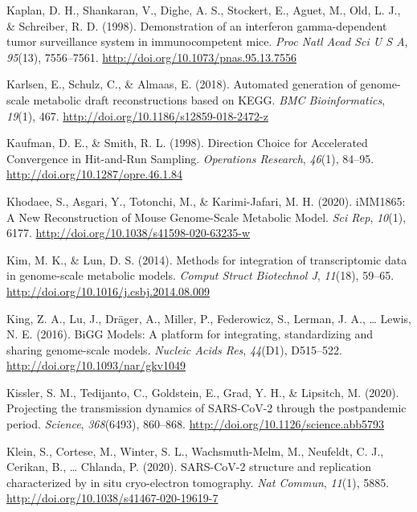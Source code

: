 \documentclass[12pt,twoside,openany,\mydriver]{thesis}  %
\begin{document}
\leavevmode\hypertarget{ref-kaplan_demonstration_1998}{}%
Kaplan, D. H., Shankaran, V., Dighe, A. S., Stockert, E., Aguet, M., Old, L. J., \& Schreiber, R. D. (1998). Demonstration of an interferon gamma-dependent tumor surveillance system in immunocompetent mice. \emph{Proc Natl Acad Sci U S A}, \emph{95}(13), 7556--7561. \url{http://doi.org/10.1073/pnas.95.13.7556}

\leavevmode\hypertarget{ref-karlsen_automated_2018}{}%
Karlsen, E., Schulz, C., \& Almaas, E. (2018). Automated generation of genome-scale metabolic draft reconstructions based on KEGG. \emph{BMC Bioinformatics}, \emph{19}(1), 467. \url{http://doi.org/10.1186/s12859-018-2472-z}

\leavevmode\hypertarget{ref-kaufman_direction_1998}{}%
Kaufman, D. E., \& Smith, R. L. (1998). Direction Choice for Accelerated Convergence in Hit-and-Run Sampling. \emph{Operations Research}, \emph{46}(1), 84--95. \url{http://doi.org/10.1287/opre.46.1.84}

\leavevmode\hypertarget{ref-khodaee_imm1865_2020}{}%
Khodaee, S., Asgari, Y., Totonchi, M., \& Karimi-Jafari, M. H. (2020). iMM1865: A New Reconstruction of Mouse Genome-Scale Metabolic Model. \emph{Sci Rep}, \emph{10}(1), 6177. \url{http://doi.org/10.1038/s41598-020-63235-w}

\leavevmode\hypertarget{ref-kim_methods_2014}{}%
Kim, M. K., \& Lun, D. S. (2014). Methods for integration of transcriptomic data in genome-scale metabolic models. \emph{Comput Struct Biotechnol J}, \emph{11}(18), 59--65. \url{http://doi.org/10.1016/j.csbj.2014.08.009}

\leavevmode\hypertarget{ref-king_bigg_2016}{}%
King, Z. A., Lu, J., Dräger, A., Miller, P., Federowicz, S., Lerman, J. A., \ldots{} Lewis, N. E. (2016). BiGG Models: A platform for integrating, standardizing and sharing genome-scale models. \emph{Nucleic Acids Res}, \emph{44}(D1), D515--522. \url{http://doi.org/10.1093/nar/gkv1049}

\leavevmode\hypertarget{ref-kissler_projecting_2020}{}%
Kissler, S. M., Tedijanto, C., Goldstein, E., Grad, Y. H., \& Lipsitch, M. (2020). Projecting the transmission dynamics of SARS-CoV-2 through the postpandemic period. \emph{Science}, \emph{368}(6493), 860--868. \url{http://doi.org/10.1126/science.abb5793}

\leavevmode\hypertarget{ref-klein_sars-cov-2_2020}{}%
Klein, S., Cortese, M., Winter, S. L., Wachsmuth-Melm, M., Neufeldt, C. J., Cerikan, B., \ldots{} Chlanda, P. (2020). SARS-CoV-2 structure and replication characterized by in situ cryo-electron tomography. \emph{Nat Commun}, \emph{11}(1), 5885. \url{http://doi.org/10.1038/s41467-020-19619-7}
\end{document}
